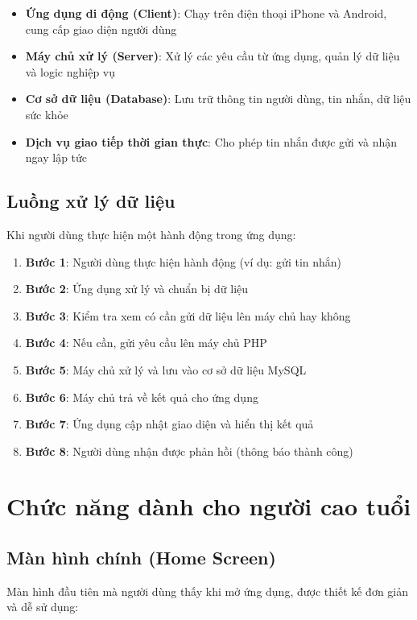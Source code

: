 \documentclass[12pt,a4paper]{article}
\begin{document}
\begin{itemize}[leftmargin=2cm]
    \item \textbf{Ứng dụng di động (Client)}: Chạy trên điện thoại iPhone và Android, cung cấp giao diện người dùng
    \item \textbf{Máy chủ xử lý (Server)}: Xử lý các yêu cầu từ ứng dụng, quản lý dữ liệu và logic nghiệp vụ
    \item \textbf{Cơ sở dữ liệu (Database)}: Lưu trữ thông tin người dùng, tin nhắn, dữ liệu sức khỏe
    \item \textbf{Dịch vụ giao tiếp thời gian thực}: Cho phép tin nhắn được gửi và nhận ngay lập tức
\end{itemize}

\subsection{Luồng xử lý dữ liệu}
Khi người dùng thực hiện một hành động trong ứng dụng:

\begin{enumerate}[leftmargin=2cm]
    \item \textbf{Bước 1}: Người dùng thực hiện hành động (ví dụ: gửi tin nhắn)
    \item \textbf{Bước 2}: Ứng dụng xử lý và chuẩn bị dữ liệu
    \item \textbf{Bước 3}: Kiểm tra xem có cần gửi dữ liệu lên máy chủ hay không
    \item \textbf{Bước 4}: Nếu cần, gửi yêu cầu lên máy chủ PHP
    \item \textbf{Bước 5}: Máy chủ xử lý và lưu vào cơ sở dữ liệu MySQL
    \item \textbf{Bước 6}: Máy chủ trả về kết quả cho ứng dụng
    \item \textbf{Bước 7}: Ứng dụng cập nhật giao diện và hiển thị kết quả
    \item \textbf{Bước 8}: Người dùng nhận được phản hồi (thông báo thành công)
\end{enumerate}

\section{Chức năng dành cho người cao tuổi}

\subsection{Màn hình chính (Home Screen)}
Màn hình đầu tiên mà người dùng thấy khi mở ứng dụng, được thiết kế đơn giản và dễ sử dụng:
\end{document}
